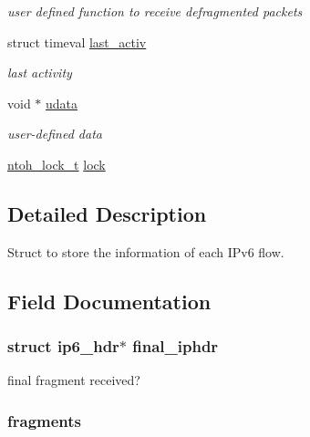 \begin{DoxyCompactItemize}
\begin{DoxyCompactList}\small\item\em user defined function to receive defragmented packets \end{DoxyCompactList}\item 
struct timeval \hyperlink{structntoh__ipv6__flow__t_a9d115049a50ba4e69eb04c23c973a4a2}{last\-\_\-activ}
\begin{DoxyCompactList}\small\item\em last activity \end{DoxyCompactList}\item 
void $\ast$ \hyperlink{structntoh__ipv6__flow__t_a697ce711b67313990d351b5c95f87aed}{udata}
\begin{DoxyCompactList}\small\item\em user-\/defined data \end{DoxyCompactList}\item 
\hyperlink{structntoh__lock__t}{ntoh\-\_\-lock\-\_\-t} \hyperlink{structntoh__ipv6__flow__t_aad15823e4f2835531e6a02321cd53f7e}{lock}
\end{DoxyCompactItemize}


\subsection{Detailed Description}
Struct to store the information of each I\-Pv6 flow. 

\subsection{Field Documentation}
\hypertarget{structntoh__ipv6__flow__t_aacadfda29e478e69be73c3f2e6bf9c79}{
\subsubsection[{final\-\_\-iphdr}]{\setlength{\rightskip}{0pt plus 5cm}struct ip6\-\_\-hdr$\ast$ final\-\_\-iphdr}}\label{structntoh__ipv6__flow__t_aacadfda29e478e69be73c3f2e6bf9c79}


final fragment received? 

\hypertarget{structntoh__ipv6__flow__t_abecfe5b83d9c9dfb2815e0579ea909fc}{
\subsubsection[{fragments}]{ fragments}}\label{structntoh__ipv6__flow__t_abecfe5b83d9c9dfb2815e0579ea909fc}


